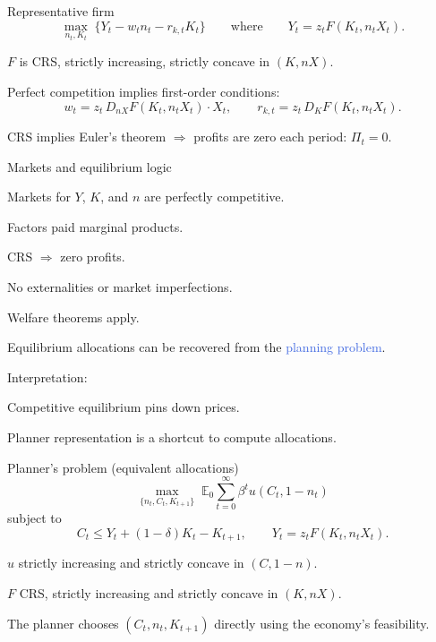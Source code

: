 \documentclass[aspectratio=169,xcolor=dvipsnames]{beamer}
\let\tempone\itemize
\let\temptwo\enditemize
\renewenvironment{itemize}{\tempone\addtolength{\itemsep}{\fill}}{\temptwo}
\providecommand{\blue}[1]{\textcolor{RoyalBlue}{#1}}
\begin{document}
\begin{frame}{Representative firm}
\label{slide:BC_Firm}
\small
\[
\max_{n_t,K_t}\; \Big\{Y_t - w_t n_t - r_{k,t}K_t\Big\}
\qquad\text{where}\qquad
Y_t = z_t F(K_t, n_t X_t).
\]
\begin{itemize}
    \item \(F\) is CRS, strictly increasing, strictly concave in \((K, nX)\).
    \item Perfect competition implies first-order conditions:
    \[
        w_t = z_t\, D_{nX}F(K_t,n_tX_t)\cdot X_t,
        \qquad
        r_{k,t} = z_t\, D_{K}F(K_t,n_tX_t).
    \]
    \item CRS implies Euler's theorem \(\Rightarrow\) profits are zero each period: \(\Pi_t = 0\).
\end{itemize}
\end{frame}

\begin{frame}{Markets and equilibrium logic}
\label{slide:BC_Markets}
\small
\begin{itemize}
    \item Markets for \(Y\), \(K\), and \(n\) are perfectly competitive.
    \begin{itemize}
        \item Factors paid marginal products.
        \item CRS \(\Rightarrow\) zero profits.
    \end{itemize}

    \item No externalities or market imperfections.
    \begin{itemize}
        \item Welfare theorems apply.
        \item Equilibrium allocations can be recovered from the \blue{planning problem}.
    \end{itemize}

    \item Interpretation:
    \begin{itemize}
        \item Competitive equilibrium pins down prices.
        \item Planner representation is a shortcut to compute allocations.
    \end{itemize}
\end{itemize}
\end{frame}

\begin{frame}{Planner's problem (equivalent allocations)}
\label{slide:BC_Planner}
\small
\[
\max_{\{n_t,C_t,K_{t+1}\}}\; \mathbb{E}_0\sum_{t=0}^{\infty}\beta^t u(C_t,1-n_t)
\]
subject to
\[
C_t \le Y_t + (1-\delta)K_t - K_{t+1},
\qquad
Y_t = z_t F(K_t, n_t X_t).
\]
\begin{itemize}
    \item \(u\) strictly increasing and strictly concave in \((C,1-n)\).
    \item \(F\) CRS, strictly increasing and strictly concave in \((K, nX)\).
    \item The planner chooses \((C_t,n_t,K_{t+1})\) directly using the economy's feasibility.
\end{itemize}
\end{frame}
\end{document}
